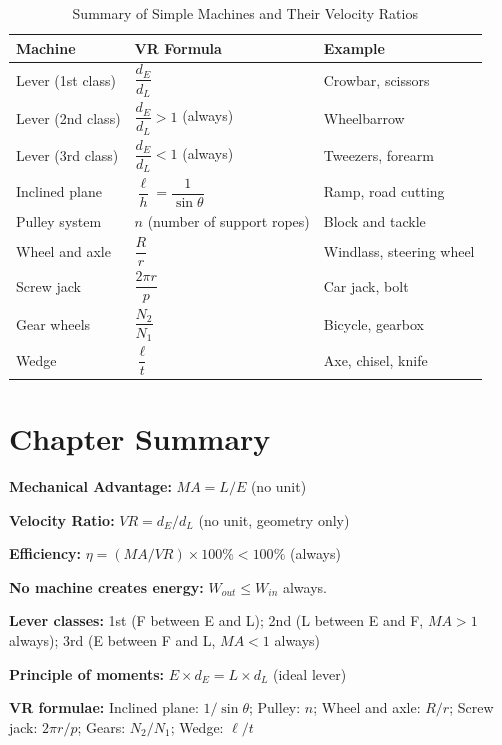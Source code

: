 \begin{table}[H]
\centering
\caption{Summary of Simple Machines and Their Velocity Ratios}
\label{tab:machines_summary}
\begin{tabular}{lll}
\toprule
\textbf{Machine} & \textbf{VR Formula} & \textbf{Example}\\
\midrule
Lever (1st class) &
  $\dfrac{d_E}{d_L}$ &
  Crowbar, scissors\\[8pt]
Lever (2nd class) &
  $\dfrac{d_E}{d_L} > 1$ (always) &
  Wheelbarrow\\[8pt]
Lever (3rd class) &
  $\dfrac{d_E}{d_L} < 1$ (always) &
  Tweezers, forearm\\[8pt]
Inclined plane &
  $\dfrac{\ell}{h} = \dfrac{1}{\sin\theta}$ &
  Ramp, road cutting\\[8pt]
Pulley system &
  $n$ (number of support ropes) &
  Block and tackle\\[8pt]
Wheel and axle &
  $\dfrac{R}{r}$ &
  Windlass, steering wheel\\[8pt]
Screw jack &
  $\dfrac{2\pi r}{p}$ &
  Car jack, bolt\\[8pt]
Gear wheels &
  $\dfrac{N_2}{N_1}$ &
  Bicycle, gearbox\\[8pt]
Wedge &
  $\dfrac{\ell}{t}$ &
  Axe, chisel, knife\\
\bottomrule
\end{tabular}
\end{table}

\section{Chapter Summary}

\begin{summarybox}
\textbf{Mechanical Advantage:} $MA = L/E$ (no unit)

\textbf{Velocity Ratio:} $VR = d_E/d_L$ (no unit,
geometry only)

\textbf{Efficiency:}
$\eta = (MA/VR) \times 100\% < 100\%$ (always)

\textbf{No machine creates energy:}
$W_{out} \leq W_{in}$ always.

\textbf{Lever classes:}
1st (F between E and L);
2nd (L between E and F, $MA > 1$ always);
3rd (E between F and L, $MA < 1$ always)

\textbf{Principle of moments:}
$E \times d_E = L \times d_L$ (ideal lever)

\textbf{VR formulae:}
Inclined plane: $1/\sin\theta$;
Pulley: $n$;
Wheel and axle: $R/r$;
Screw jack: $2\pi r/p$;
Gears: $N_2/N_1$;
Wedge: $\ell/t$
\end{summarybox}

